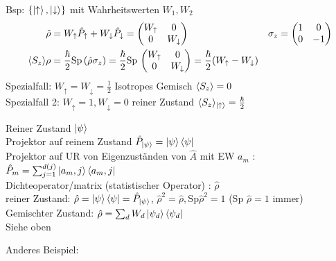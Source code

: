 	Bsp: $\{\ket{\uparrow}, \ket{\downarrow} \}$ mit Wahrheitswerten $W_1, W_2$ 
		\begin{align*}
			\hat{\rho} &= W_\uparrow \hat{P}_\uparrow + W_\downarrow \hat{P}_\downarrow =
			\begin{pmatrix}
				W_\uparrow & 0 \\
				0 & W_\downarrow 
			\end{pmatrix}&
			\sigma_z &= 
			\begin{pmatrix}
				1 & 0 \\
				0 & -1
			\end{pmatrix} \\
			\langle {S_z} \rangle \rho &= 
			\frac{\hbar}{2} \mathrm{Sp}\, (\hat{\rho} \sigma_z) =
			\frac{\hbar}{2} \mathrm{Sp}\, 
			\begin{pmatrix}
			W_\uparrow & 0 \\
			0 & W_\downarrow 
			\end{pmatrix} =
			\frac{\hbar}{2} (W_\uparrow - W_\downarrow) 
		\end{align*}
	Spezialfall: $W_\uparrow = W_\downarrow = \frac{1}{2}$ Isotropes Gemisch $\langle {S_z} \rangle = 0$
	\\
	Spezialfall 2: $W_\uparrow = 1, W_\downarrow = 0$ reiner Zustand $\langle {S_z} \rangle_{\ket{\uparrow}} = \frac{\hbar}{2}$
	
	Reiner Zustand $\ket{\psi}$  \\
	Projektor auf reinem Zustand $ \hat{P}_{\ket{\psi}} = \ket{\psi} \bra{\psi}$ \\
	Projektor auf UR von Eigenzuständen von $\hat{A}$ mit EW $a_m$ : 
	$\hat{P}_m = \sum_{j = 1}^{d(j)} \ket{a_m, j} \bra{a_m, j}$ \\
	Dichteoperator/matrix (statistischer Operator) : $\hat{\rho}$ \\
	reiner Zustand: $\hat{\rho} = \ket{\psi} \bra{\psi} = \hat{P}_{\ket{\psi}}$,
	$\hat{\rho}^2 = \hat{\rho} , \mathrm{Sp} \hat{\rho}^2 = 1$ (Sp $\hat{\rho} = 1$ immer)\\
	Gemischter Zustand: $\hat{\rho} = \sum_d W_d \ket{\psi_d} \bra{\psi_d}$ \\
	Siehe oben
	
	Anderes Beispiel:
	
